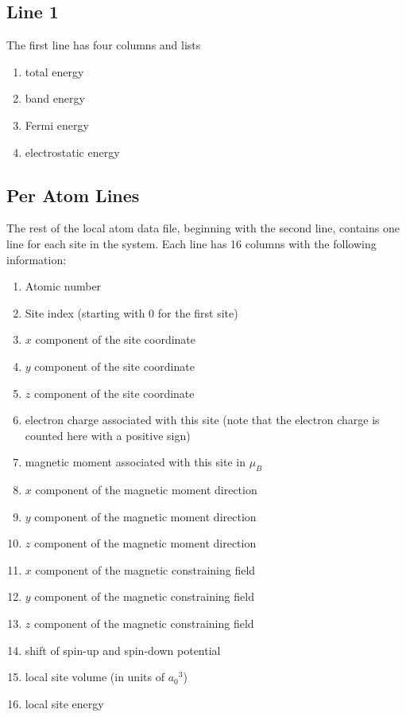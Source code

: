 \subsection{Line 1}
The first line has four columns and lists
\begin{enumerate}
\item total energy
\item band energy
\item Fermi energy
\item electrostatic energy
\end{enumerate}
\subsection{Per Atom Lines}
The rest of the local atom data file, beginning with the second line, contains one line for each site in the system.
Each line has 16 columns with the following information:
\begin{enumerate}
\item Atomic number
\item Site index (starting with 0 for the first site)
\item $x$ component of the site coordinate
\item $y$ component of the site coordinate
\item $z$ component of the site coordinate
\item electron charge associated with this site (note that the electron charge is counted here with a positive sign)
\item magnetic moment associated with this site in $\mu_B$
\item $x$ component of the magnetic moment direction
\item $y$ component of the magnetic moment direction
\item $z$ component of the magnetic moment direction
\item $x$ component of the magnetic constraining field
\item $y$ component of the magnetic constraining field
\item $z$ component of the magnetic constraining field
\item shift of spin-up and spin-down potential
\item local site volume (in units of ${a_0}^3$)
\item local site energy
\end{enumerate}


